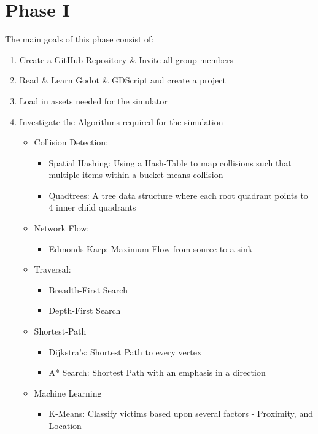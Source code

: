 \documentclass[12pt]{article}
\begin{document}
\section*{Phase I}
The main goals of this phase consist of:
\begin{enumerate}
\item Create a GitHub Repository \& Invite all group members
\item Read \& Learn Godot \& GDScript and create a project
\item Load in assets needed for the simulator
\item Investigate the Algorithms required for the simulation
	\begin{itemize}
	\item Collision Detection: 
		\begin{itemize}
		\item Spatial Hashing: Using a Hash-Table to map collisions 
		such that multiple items within a bucket means collision
		\item Quadtrees: A tree data structure where each root quadrant 			points to 4 inner child quadrants
		\end{itemize}
	\item Network Flow:
		\begin{itemize}
		\item Edmonds-Karp: Maximum Flow from source to a sink
		\end{itemize}
	\item Traversal:
		\begin{itemize}
		\item Breadth-First Search
		\item Depth-First Search
		\end{itemize}
	\item Shortest-Path
		\begin{itemize}
		\item Dijkstra's: Shortest Path to every vertex
		\item A* Search: Shortest Path with an emphasis in a direction
		\end{itemize}
	\item Machine Learning
		\begin{itemize}
		\item K-Means: Classify victims based upon several factors - 				Proximity, and Location
		\end{itemize}
	\end{itemize}
\end{enumerate}
\end{document}
